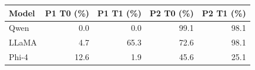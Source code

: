 \begin{tabular}{@{}lrrrr@{}}
\toprule
Model & P1 T0 (\%) & P1 T1 (\%) & P2 T0 (\%) & P2 T1 (\%) \\
\midrule
Qwen & 0.0 & 0.0 & 99.1 & 98.1 \\
LLaMA & 4.7 & 65.3 & 72.6 & 98.1 \\
Phi-4 & 12.6 & 1.9 & 45.6 & 25.1 \\
\bottomrule
\end{tabular}
